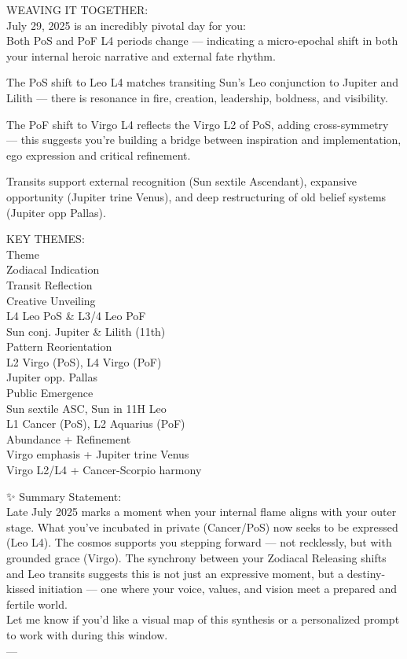 \documentclass{article}
\begin{document}
 WEAVING IT TOGETHER:\\
July 29, 2025 is an incredibly pivotal day for you:\\
Both PoS and PoF L4 periods change --- indicating a micro-epochal shift
in both your internal heroic narrative and external fate rhythm.

The PoS shift to Leo L4 matches transiting Sun's Leo conjunction to
Jupiter and Lilith --- there is resonance in fire, creation, leadership,
boldness, and visibility.

The PoF shift to Virgo L4 reflects the Virgo L2 of PoS, adding
cross-symmetry --- this suggests you're building a bridge between
inspiration and implementation, ego expression and critical refinement.

Transits support external recognition (Sun sextile Ascendant), expansive
opportunity (Jupiter trine Venus), and deep restructuring of old belief
systems (Jupiter opp Pallas).

 KEY THEMES:\\
Theme\\
Zodiacal Indication\\
Transit Reflection\\
Creative Unveiling\\
L4 Leo PoS \& L3/4 Leo PoF\\
Sun conj. Jupiter \& Lilith (11th)\\
Pattern Reorientation\\
L2 Virgo (PoS), L4 Virgo (PoF)\\
Jupiter opp. Pallas\\
Public Emergence\\
Sun sextile ASC, Sun in 11H Leo\\
L1 Cancer (PoS), L2 Aquarius (PoF)\\
Abundance + Refinement\\
Virgo emphasis + Jupiter trine Venus\\
Virgo L2/L4 + Cancer-Scorpio harmony

✨ Summary Statement:\\
Late July 2025 marks a moment when your internal flame aligns with your
outer stage. What you've incubated in private (Cancer/PoS) now seeks to
be expressed (Leo L4). The cosmos supports you stepping forward --- not
recklessly, but with grounded grace (Virgo). The synchrony between your
Zodiacal Releasing shifts and Leo transits suggests this is not just an
expressive moment, but a destiny-kissed initiation --- one where your
voice, values, and vision meet a prepared and fertile world.\\
Let me know if you'd like a visual map of this synthesis or a
personalized prompt to work with during this window.\\
---
\end{document}
